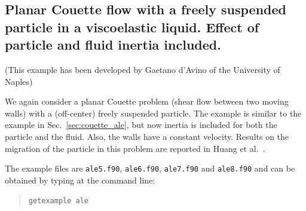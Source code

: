 \subsection{Planar Couette flow with a freely suspended particle
in a viscoelastic liquid. Effect of particle and fluid inertia included.}
\label{sec:couette_ale_inertia_viscoelastic}

(This example has been developed by Gaetano d'Avino of the University of
Naples)

We again
consider a planar Couette problem (shear flow between two moving walls) with
a (off-center) freely suspended particle. The example is similar to the example
in Sec.~\ref{sec:couette_ale}, but now 
inertia is included for both the particle and the fluid. Also, the walls have a
constant velocity. Results on the migration of the particle in this problem
are reported in Huang et al.\ \cite{Huang97}.

The example files are \texttt{ale5.f90}, \texttt{ale6.f90}, \texttt{ale7.f90}
and \texttt{ale8.f90} and can be obtained by typing at the
command line:
\medskip
\begin{quote}
   \texttt{getexample ale}
\end{quote}


